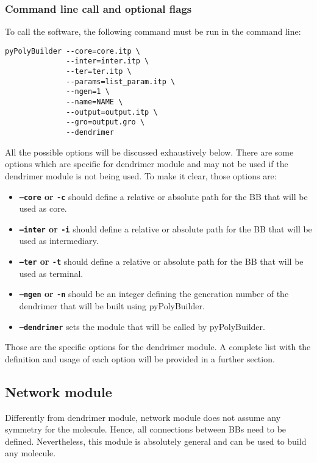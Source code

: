 \documentclass[12pt]{article}
\begin{document}
\subsubsection{Command line call and optional flags}

To call the software, the following command must be run in the command line:

\begin{lstlisting}
pyPolyBuilder --core=core.itp \
              --inter=inter.itp \
              --ter=ter.itp \
              --params=list_param.itp \
              --ngen=1 \
              --name=NAME \
              --output=output.itp \
              --gro=output.gro \
              --dendrimer
\end{lstlisting}

All the possible options will be discussed exhaustively below.
There are some options which are specific for dendrimer module and may not be used if the dendrimer module is not being used.
To make it clear, those options are:

\begin{itemize}
    \item \textbf{\texttt{--core} or \texttt{-c}} should define a relative or absolute path for the BB that will be used as core.
        
    \item \textbf{\texttt{--inter} or \texttt{-i}} should define a relative or absolute path for the BB that will be used as intermediary.
    
    \item \textbf{\texttt{--ter} or \texttt{-t}} should define a relative or absolute path for the BB that will be used as terminal.
    
    \item \textbf{\texttt{--ngen} or \texttt{-n}} should be an integer defining the generation number of the dendrimer that will be built using pyPolyBuilder.
    
    \item \textbf{\texttt{--dendrimer}} sets the module that will be called by pyPolyBuilder.
\end{itemize}

Those are the specific options for the dendrimer module.
A complete list with the definition and usage of each option will be provided in a further section.

\subsection{Network module}
Differently from dendrimer module, network module does not assume any symmetry for the molecule.
Hence, all connections between BBs need to be defined.
Nevertheless, this module is absolutely general and can be used to build any molecule.
\end{document}
